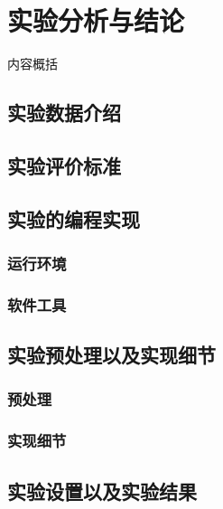 \chapter{实验分析与结论}

内容概括\cite{Zuo10}



\section{实验数据介绍}




\section{实验评价标准}





\section{实验的编程实现}


\subsection{运行环境}


\subsection{软件工具}






\section{实验预处理以及实现细节}

\subsection{预处理}



\subsection{实现细节}







\section{实验设置以及实验结果}



